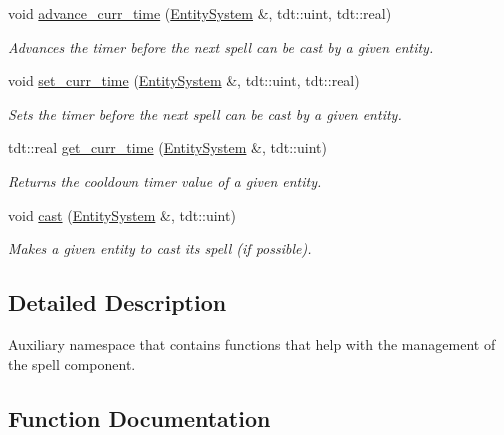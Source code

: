 \begin{DoxyCompactItemize}
void \hyperlink{namespace_spell_helper_a88b021e2f72be6d3215cd11a123a6634}{advance\+\_\+curr\+\_\+time} (\hyperlink{class_entity_system}{Entity\+System} \&, tdt\+::uint, tdt\+::real)
\begin{DoxyCompactList}\small\item\em Advances the timer before the next spell can be cast by a given entity. \end{DoxyCompactList}\item 
void \hyperlink{namespace_spell_helper_a5c68c84fd102f9494fe1fb40132fb255}{set\+\_\+curr\+\_\+time} (\hyperlink{class_entity_system}{Entity\+System} \&, tdt\+::uint, tdt\+::real)
\begin{DoxyCompactList}\small\item\em Sets the timer before the next spell can be cast by a given entity. \end{DoxyCompactList}\item 
tdt\+::real \hyperlink{namespace_spell_helper_add93fee8b625d2db80e1d91332317b35}{get\+\_\+curr\+\_\+time} (\hyperlink{class_entity_system}{Entity\+System} \&, tdt\+::uint)
\begin{DoxyCompactList}\small\item\em Returns the cooldown timer value of a given entity. \end{DoxyCompactList}\item 
void \hyperlink{namespace_spell_helper_afc0fa31a81a94177f4b7269fe12b2057}{cast} (\hyperlink{class_entity_system}{Entity\+System} \&, tdt\+::uint)
\begin{DoxyCompactList}\small\item\em Makes a given entity to cast it\textquotesingle{}s spell (if possible). \end{DoxyCompactList}\end{DoxyCompactItemize}


\subsection{Detailed Description}
Auxiliary namespace that contains functions that help with the management of the spell component. 

\subsection{Function Documentation}
